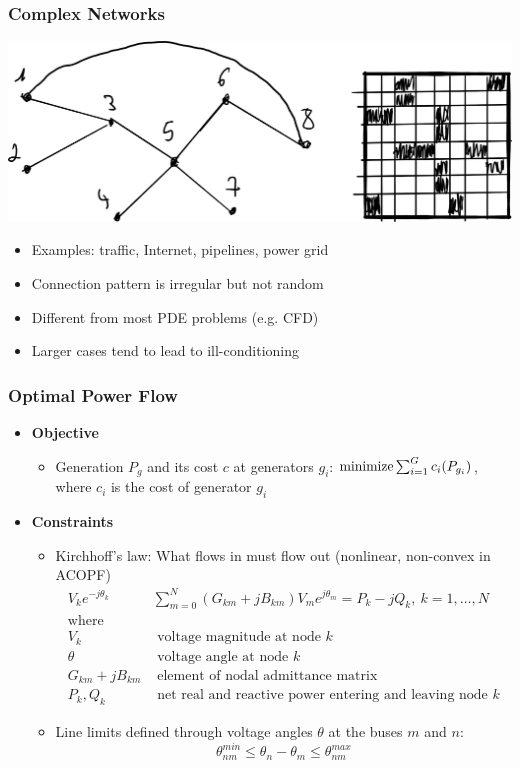 \begin{frame}
  \frametitle{Complex Networks}
  \includegraphics[width=\textwidth]{figures/complexn}
  \begin{itemize}
    \item Examples: traffic, Internet, pipelines, power grid
    \item Connection pattern is irregular but not random
    \item Different from most PDE problems (e.g. CFD)
    \item Larger cases tend to lead to ill-conditioning
  \end{itemize}
\end{frame}

\begin{frame}[fragile]
  \frametitle{Optimal Power Flow}
  \begin{itemize}
    \item {\bf Objective}
    \begin{itemize}
      \item Generation $P_g$ and its cost $c$ at generators $g_i$:
      $ \minimize \sum^G_{i=1} c_i(P_{g_i})$, where $c_i$ is the cost of generator $g_i$
    \end{itemize}
    \item {\bf Constraints}
    \begin{itemize}
      \item Kirchhoff's law: What flows in must flow out (nonlinear, non-convex in ACOPF)
      \begin{align*}
        V_k e^{-j\theta_k} & \sum^{N}_{m=0} (G_{km} + jB_{km})V_m e^{j\theta_m} = P_k - j Q_k,\ k = 1, \dots, N \\
        \text{where}\\
        V_k &\text{ voltage magnitude at node } k\\
        \theta &\text{ voltage angle at node } k\\
        G_{km} + jB_{km}& \text{ element of nodal admittance matrix}\\
        P_k , Q_k &\text{ net real and reactive power entering and leaving node } k
      \end{align*}
      \item Line limits defined through voltage angles $\theta$ at the buses $m$ and $n$:
      $$ \theta^{min}_{nm} \leq \theta_n - \theta_m \leq \theta^{max}_{nm}$$
    \end{itemize}
  \end{itemize}
\end{frame}

